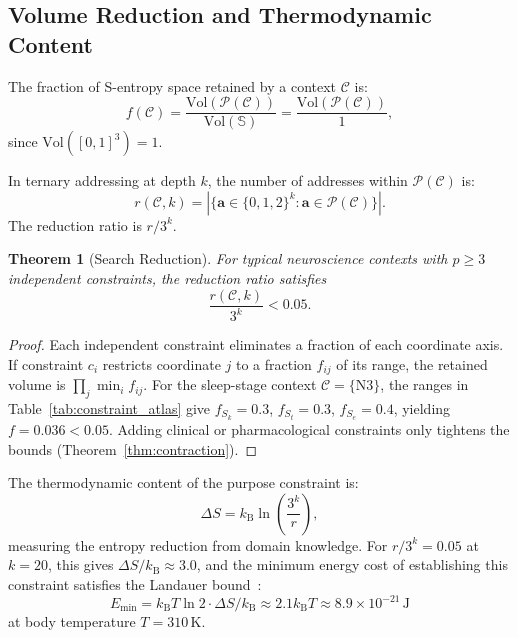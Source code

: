 \documentclass[aps,prd,twocolumn,superscriptaddress,floatfix,nofootinbib]{revtex4-2}
\newtheorem{theorem}{Theorem}[section]
\theoremstyle{remark}
\newcommand{\kB}{k_{\mathrm{B}}}
\newcommand{\Sk}{S_k}
\newcommand{\St}{S_t}
\newcommand{\Se}{S_e}
\newcommand{\Purpose}{\mathcal{P}}
\newcommand{\Context}{\mathcal{C}}
\newcommand{\Sspace}{\mathbb{S}}
\begin{document}
\subsection{Volume Reduction and Thermodynamic Content}

The fraction of S-entropy space retained by a context $\Context$ is:
\begin{equation}
f(\Context) = \frac{\mathrm{Vol}(\Purpose(\Context))}{\mathrm{Vol}(\Sspace)} = \frac{\mathrm{Vol}(\Purpose(\Context))}{1},
\end{equation}
since $\mathrm{Vol}([0,1]^3) = 1$.

In ternary addressing at depth $k$, the number of addresses within $\Purpose(\Context)$ is:
\begin{equation}
r(\Context, k) = |\{\mathbf{a} \in \{0,1,2\}^k : \mathbf{a} \in \Purpose(\Context)\}|.
\end{equation}
The reduction ratio is $r / 3^k$.

\begin{theorem}[Search Reduction]
\label{thm:reduction}
For typical neuroscience contexts with $p \geq 3$ independent constraints, the reduction ratio satisfies
\begin{equation}
\frac{r(\Context, k)}{3^k} < 0.05.
\end{equation}
\end{theorem}

\begin{proof}
Each independent constraint eliminates a fraction of each coordinate axis.
If constraint $c_i$ restricts coordinate $j$ to a fraction $f_{ij}$ of its range, the retained volume is $\prod_{j} \min_i f_{ij}$.
For the sleep-stage context $\Context = \{\text{N3}\}$, the ranges in Table~\ref{tab:constraint_atlas} give $f_{\Sk} = 0.3$, $f_{\St} = 0.3$, $f_{\Se} = 0.4$, yielding $f = 0.036 < 0.05$.
Adding clinical or pharmacological constraints only tightens the bounds (Theorem~\ref{thm:contraction}).
\end{proof}

The thermodynamic content of the purpose constraint is:
\begin{equation}
\boxed{\Delta S = \kB \ln\!\left(\frac{3^k}{r}\right),}
\label{eq:purpose_entropy}
\end{equation}
measuring the entropy reduction from domain knowledge.
For $r/3^k = 0.05$ at $k = 20$, this gives $\Delta S / \kB \approx 3.0$, and the minimum energy cost of establishing this constraint satisfies the Landauer bound~\cite{landauer1961}:
\begin{equation}
E_{\min} = \kB T \ln 2 \cdot \Delta S / \kB \approx 2.1 \kB T \approx 8.9 \times 10^{-21}\,\mathrm{J}
\end{equation}
at body temperature $T = 310$\,K.
\end{document}
